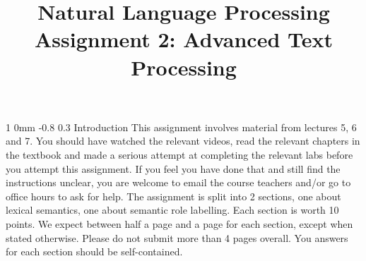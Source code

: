 \documentclass[11pt]{article}
\title{{\LARGE Natural Language Processing}\\[1.5mm]{\large Assignment 2: Advanced Text Processing}}%
\author{}
\date{} %
\makeatletter
\renewcommand{\section}{\@startsection
{section}%
{1}%
{0mm}%
{-0.8\baselineskip}%
{0.3\baselineskip}%
{\bfseries\large}}%
\makeatother
\begin{document}


\maketitle

\section{Introduction}
\noindent This assignment involves material from lectures 5, 6 and
7. You should have watched the relevant videos, read the relevant
chapters in the textbook and made a serious attempt at completing the
relevant labs before you attempt this assignment. If you feel you have
done that and still find the instructions unclear, you are welcome to
email the course teachers and/or go to office hours to ask for help.
The assignment is split into 2 sections, one about lexical semantics,
one about semantic role labelling. Each section is worth 10 points. We
expect between half a page and a page for each section, except when
stated otherwise. Please do not submit more than 4 pages overall.  You
answers for each section should be self-contained.  
\end{document}
